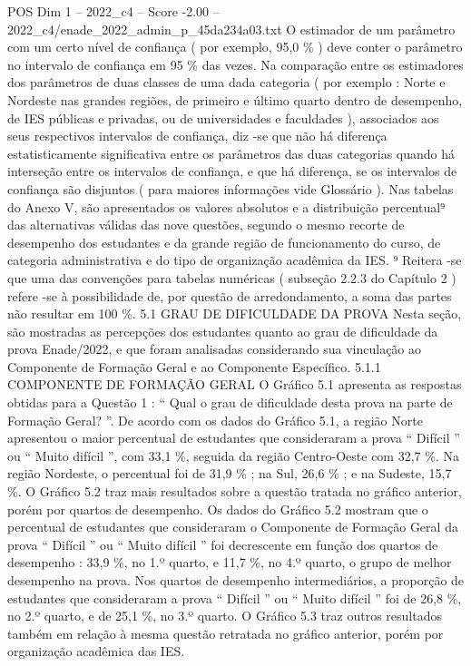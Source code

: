 \begin{textsample}{POS Dim 1 – 2022\_c4 – Score -2.00 – 2022\_c4/enade\_2022\_admin\_p\_45da234a03.txt}
O estimador de um parâmetro com um certo nível de confiança ( por exemplo, 95,0 \% ) deve conter o parâmetro no intervalo de confiança em 95 \% das vezes.
Na comparação entre os estimadores dos parâmetros de duas classes de uma dada categoria ( por exemplo : Norte e Nordeste nas grandes regiões, de primeiro e último quarto dentro de desempenho, de IES públicas e privadas, ou de universidades e faculdades ), associados aos seus respectivos intervalos de confiança, diz -se que não há diferença estatisticamente significativa entre os parâmetros das duas categorias quando há interseção entre os intervalos de confiança, e que há diferença, se os intervalos de confiança são disjuntos ( para maiores informações vide Glossário ).
Nas tabelas do Anexo V, são apresentados os valores absolutos e a distribuição percentual⁹ das alternativas válidas das nove questões, segundo o mesmo recorte de desempenho dos estudantes e da grande região de funcionamento do curso, de categoria administrativa e do tipo de organização acadêmica da IES. ⁹ Reitera -se que uma das convenções para tabelas numéricas ( subseção 2.2.3 do Capítulo 2 ) refere -se à possibilidade de, por questão de arredondamento, a soma das partes não resultar em 100 \%. 5.1 GRAU DE DIFICULDADE DA PROVA Nesta seção, são mostradas as percepções dos estudantes quanto ao grau de dificuldade da prova Enade/2022, e que foram analisadas considerando sua vinculação ao Componente de Formação Geral e ao Componente Específico. 5.1.1 COMPONENTE DE FORMAÇÃO GERAL O Gráfico 5.1 apresenta as respostas obtidas para a Questão 1 : “ Qual o grau de dificuldade desta prova na parte de Formação Geral? ”.
De acordo com os dados do Gráfico 5.1, a região Norte apresentou o maior percentual de estudantes que consideraram a prova “ Difícil ” ou “ Muito difícil ”, com 33,1 \%, seguida da região Centro-Oeste com 32,7 \%.
Na região Nordeste, o percentual foi de 31,9 \% ; na Sul, 26,6 \% ; e na Sudeste, 15,7 \%.
O Gráfico 5.2 traz mais resultados sobre a questão tratada no gráfico anterior, porém por quartos de desempenho.
Os dados do Gráfico 5.2 mostram que o percentual de estudantes que consideraram o Componente de Formação Geral da prova “ Difícil ” ou “ Muito difícil ” foi decrescente em função dos quartos de desempenho : 33,9 \%, no 1.º quarto, e 11,7 \%, no 4.º quarto, o grupo de melhor desempenho na prova.
Nos quartos de desempenho intermediários, a proporção de estudantes que consideraram a prova “ Difícil ” ou “ Muito difícil ” foi de 26,8 \%, no 2.º quarto, e de 25,1 \%, no 3.º quarto.
O Gráfico 5.3 traz outros resultados também em relação à mesma questão retratada no gráfico anterior, porém por organização acadêmica das IES.

\end{textsample}
